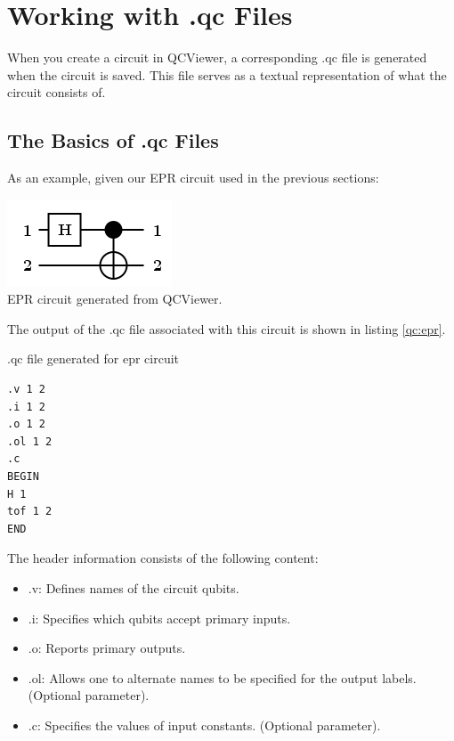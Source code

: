 \documentclass[10pt]{article}
\theoremstyle{definition}
\begin{document}
\section{Working with .qc Files}\label{sec:QCFiles}

When you create a circuit in QCViewer, a corresponding .qc file is generated when the circuit is saved. This file serves as a textual representation of what the circuit consists of. 

\subsection{The Basics of .qc Files}\label{sec:BasicsOfQCFiles}

As an example, given our EPR circuit used in the previous sections:

\begin{center}
\includegraphics[scale=.7]{Figures/QCFiles/EPRCircuit} \\
EPR circuit generated from QCViewer.
\end{center}

The output of the .qc file associated with this circuit is shown in listing \ref{qc:epr}.

\begin{program}
\caption{.qc file generated for epr circuit}
\label{qc:epr}
\begin{verbatim}
.v 1 2
.i 1 2
.o 1 2
.ol 1 2
.c
BEGIN
H 1
tof 1 2
END
\end{verbatim}
\end{program}

The header information consists of the following content:

\begin{itemize}
\item .v: Defines names of the circuit qubits.
\item .i: Specifies which qubits accept primary inputs.
\item .o: Reports primary outputs.
\item .ol: Allows one to alternate names to be specified for the output labels. (Optional parameter).
\item .c: Specifies the values of input constants. (Optional parameter).
\end{itemize}
\end{document}
